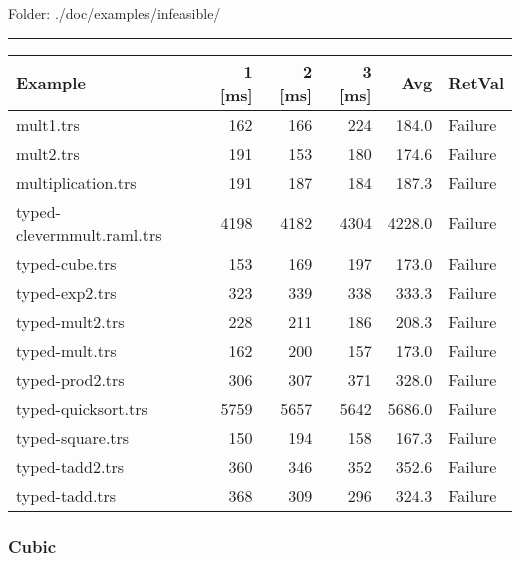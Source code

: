 \documentclass[11pt]{article}
\begin{document}
Folder: ./doc/examples/infeasible/

\rule{\linewidth}{0.5pt}

\begin{center}
\begin{tabular}{lrrrrl}
Example & 1 [ms] & 2 [ms] & 3 [ms] & Avg & RetVal\\
\hline
mult1.trs & 162 & 166 & 224 & 184.0 & Failure\\
mult2.trs & 191 & 153 & 180 & 174.6 & Failure\\
multiplication.trs & 191 & 187 & 184 & 187.3 & Failure\\
typed-clevermmult.raml.trs & 4198 & 4182 & 4304 & 4228.0 & Failure\\
typed-cube.trs & 153 & 169 & 197 & 173.0 & Failure\\
typed-exp2.trs & 323 & 339 & 338 & 333.3 & Failure\\
typed-mult2.trs & 228 & 211 & 186 & 208.3 & Failure\\
typed-mult.trs & 162 & 200 & 157 & 173.0 & Failure\\
typed-prod2.trs & 306 & 307 & 371 & 328.0 & Failure\\
typed-quicksort.trs & 5759 & 5657 & 5642 & 5686.0 & Failure\\
typed-square.trs & 150 & 194 & 158 & 167.3 & Failure\\
typed-tadd2.trs & 360 & 346 & 352 & 352.6 & Failure\\
typed-tadd.trs & 368 & 309 & 296 & 324.3 & Failure\\
\end{tabular}

\end{center}


\pagebreak

\subsubsection{Cubic}
\label{sec:org6b12a28}
\end{document}
